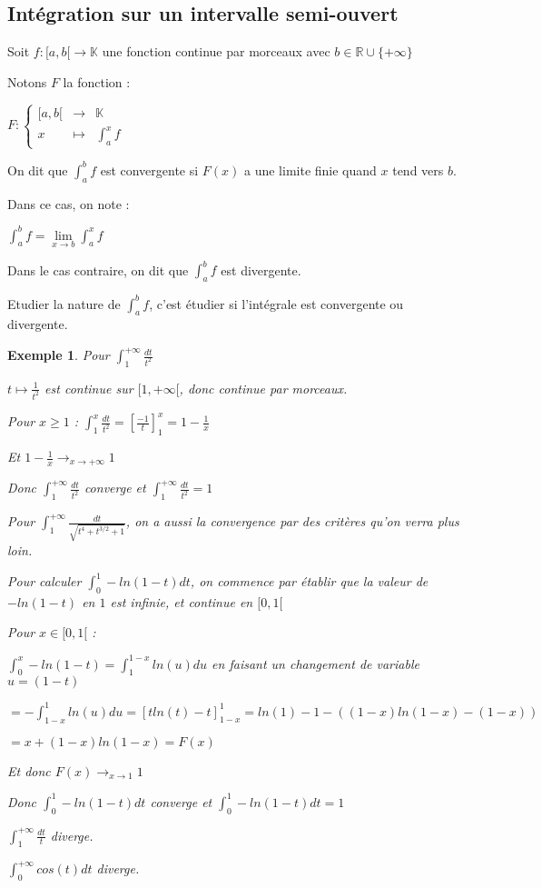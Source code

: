 \documentclass[a4paper,12pt]{book}
\newcommand{\Def}[2]{\begin{tcolorbox}[sharp corners, colback=white,colframe=blue!90!black!75, title=Définition : #1]#2\end{tcolorbox}}
\newtheorem{Exe}{Exemple}[section]
\def\R{\mathbb{R}}
\def\K{\mathbb{K}}
\begin{document}
\subsection{Intégration sur un intervalle semi-ouvert}
\Def{}{Soit $f:[a,b[\to\K$ une fonction continue par morceaux avec $b\in\R\cup\{+\infty\}$ \par Notons $F$ la fonction : \par \begin{center} $F :\left\{\begin{array}{rcl}[a,b[ & \to & \K \\ x & \mapsto & \int_a^x f\end{array}\right.$ \end{center}
\par On dit que $\int_a^bf$ est convergente si $F(x)$ a une limite finie quand $x$ tend vers $b$. \par Dans ce cas, on note : \par \begin{center} $\int_a^bf=\lim\limits_{x\to b}\int_a^xf$\end{center} \par Dans le cas contraire, on dit que $\int_a^bf$ est divergente. \par Etudier la nature de $\int_a^bf$, c'est étudier si l'intégrale est convergente ou divergente.}
\begin{Exe}
Pour $\int_1^{+\infty}\frac{dt}{t^2}$ \par $t\mapsto\frac{1}{t^2}$ est continue sur $[1,+\infty[$, donc continue par morceaux. \par Pour $x\geq 1$ : $\int_1^x \frac{dt}{t^2} = \left[\frac{-1}{t}\right]_1^x = 1-\frac{1}{x}$\par Et $1-\frac{1}{x}\to_{x\to+\infty} 1$ \par Donc $\int_1^{+\infty}\frac{dt}{t^2}$ converge et $\int_1^{+\infty}\frac{dt}{t^2}=1$
\par Pour $\int_1^{+\infty}\frac{dt}{\sqrt{t^4+t^{3/2}+1}}$, on a aussi la convergence par des critères qu'on verra plus loin.
\par Pour calculer $\int_0^1-ln(1-t)dt$, on commence par établir que la valeur de $-ln(1-t)$ en $1$ est infinie, et continue en $[0,1[$ \par Pour $x\in[0,1[$ :\par $\int_0^x -ln(1-t) = \int_1^{1-x}ln(u)du$ en faisant un changement de variable $u=(1-t)$ \par $ = -\int_{1-x}^1 ln(u)du = \left[tln(t)-t\right]_{1-x}^1 = ln(1)-1 -( (1-x)ln(1-x) - (1 - x))$ \par $= x+(1-x)ln(1-x) = F(x)$ \par Et donc $F(x)\to_{x\to 1}1$ \par Donc $\int_0^1-ln(1-t)dt$ converge et $\int_0^1-ln(1-t)dt=1$
\par $\int_1^{+\infty}\frac{dt}{t}$ diverge. \par $\int_0^{+\infty}cos(t)dt$ diverge.
\end{Exe}
\end{document}
